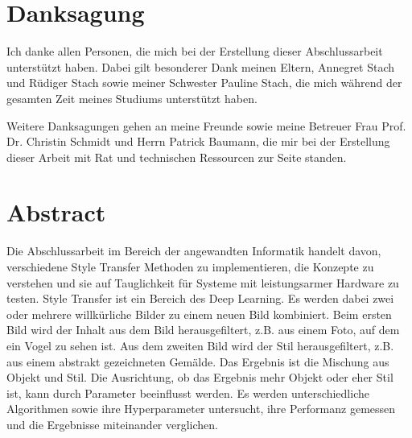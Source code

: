 \chapter*{Danksagung}

Ich danke allen Personen, die mich bei der Erstellung dieser Abschlussarbeit unterstützt haben. Dabei gilt besonderer Dank meinen Eltern, Annegret Stach und Rüdiger Stach sowie meiner Schwester Pauline Stach, die mich während der gesamten Zeit meines Studiums unterstützt haben.

Weitere Danksagungen gehen an meine Freunde sowie meine Betreuer Frau Prof. Dr. Christin Schmidt und Herrn Patrick Baumann, die mir bei der Erstellung dieser Arbeit mit Rat und technischen Ressourcen zur Seite standen.

\pagebreak

\chapter*{Abstract}

Die Abschlussarbeit im Bereich der angewandten Informatik handelt davon, verschiedene Style Transfer Methoden zu implementieren, die Konzepte zu verstehen und sie auf Tauglichkeit für Systeme mit leistungsarmer Hardware zu testen. Style Transfer ist ein Bereich des Deep Learning. Es werden dabei zwei oder mehrere willkürliche Bilder zu einem neuen Bild kombiniert. Beim ersten Bild wird der Inhalt aus dem Bild herausgefiltert, z.B. aus einem Foto, auf dem ein Vogel zu sehen ist. Aus dem zweiten Bild wird der Stil herausgefiltert, z.B. aus einem abstrakt gezeichneten Gemälde. Das Ergebnis ist die Mischung aus Objekt und Stil. Die Ausrichtung, ob das Ergebnis mehr Objekt oder eher Stil ist, kann durch Parameter beeinflusst werden. Es werden unterschiedliche Algorithmen sowie ihre Hyperparameter untersucht, ihre Performanz gemessen und die Ergebnisse miteinander verglichen.